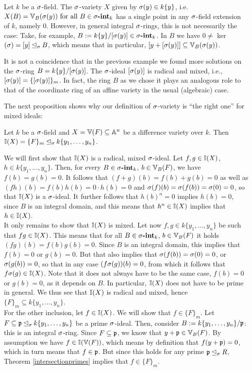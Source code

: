 \begin{ex}
Let $k$ be a $\sigma$-field. The $\sigma$-variety $X$ given by $\sigma(y) \in k\{y\}$, i.e. $X(B) = \mathbb{V}_B(\sigma(y)) \text{ for all } B \in \sigma\text{{\normalfont\textbf{-int}}}_k$ has a single point in any $\sigma$-field extension of $k$, namely $0$. However, in general integral $\sigma$-rings,
this is not necessarily the case: Take, for example, $B:= k\{y\}/[\sigma(y)] \in \sigma\text{{\normalfont\textbf{-int}}}_k$. In $B$ we have $0 \neq $ ker$(\sigma) = [y] \unlhd_{\sigma} B$, which means that in particular, $[y + [\sigma(y)]] \subseteq \mathbb{V}_B(\sigma(y))$.
\end{ex}

It is not a coincidence that in the previous example we found more solutions on the $\sigma$-ring $B = k\{y\}/[\sigma(y)]$. The $\sigma$-ideal $[\sigma(y)]$ is radical and mixed, i.e., $[\sigma(y)] = \{ [\sigma(y)] \}_m$.
In fact, the ring $B$ as we chose it plays an analogous role to that of the coordinate ring of an affine variety in the usual (algebraic) case.

The next proposition shows why our definition of $\sigma$-variety is ``the right one'' for mixed ideals:

\begin{prop}\label{I=F_m}
Let $k$ be a $\sigma$-field and $X = \mathbb{V}(F) \subseteq \mathbb{A}^n$ be a difference variety over $k$. Then $\mathbb{I}(X) = \{F\}_m \unlhd_{\sigma} k\{y_1,\ldots,y_n\}$. 
\begin{bew}
We will first show that $\mathbb{I}(X)$ is a radical, mixed $\sigma$-ideal.
Let $f, g \in \mathbb{I}(X)$, $h \in k\{y_1,\ldots,y_n\}$. Then, for every $B \in \sigma\text{{\normalfont\textbf{-int}}}_k$, $b \in \mathbb{V}_B(F)$, we have $f(b) = g(b) = 0$.
It follows that $(f + g)(b) = f(b) + g(b) = 0$ as well as $(fh)(b) = f(b)h(b) = 0 \cdot h(b) = 0$ and $\sigma(f)(b) = \sigma(f(b)) = \sigma(0) = 0$, so that $\mathbb{I}(X)$ is a $\sigma$-ideal.
It further follows that $h(b)^n = 0$ implies $h(b) = 0$, since $B$ is an integral domain, and this means that $h^n \in \mathbb{I}(X)$ implies that $ h \in \mathbb{I}(X)$. \\
\indent It only remains to show that $\mathbb{I}(X)$ is mixed. Let now $f,g \in k\{y_1,\ldots,y_n\}$ be such that $fg \in \mathbb{I}(X)$. This means that for all  $B \in \sigma\text{{\normalfont\textbf{-int}}}_k$, $b \in \mathbb{V}_B(F)$ it holds
 $(fg)(b) = f(b) g(b) = 0$. Since $B$ is an integral domain,
this implies that $f(b) = 0$ or $g(b) = 0$. But that also implies that $\sigma(f(b)) = \sigma(0) = 0$, or $\sigma(g(b)) = 0$, so that in any case $(f\sigma(g))(b) = 0$, from which it follows that $f\sigma(g) \in \mathbb{I}(X)$.
Note that it does not always have to be the same case, $f(b) = 0$ or $g(b) = 0$, as it depends on $B$. In particular, $\mathbb{I}(X)$ does not have to be prime in general. We thus see that $\mathbb{I}(X)$ is radical and mixed, hence $\{F\}_m \subseteq k\{y_1,\ldots,y_n\}$. \\
\indent For the other inclusion, let $f \in \mathbb{I}(X)$. We will show that $f \in \{F\}_m$. Let $F \subseteq \mathfrak{p} \unlhd_{\sigma} k\{y_1,\ldots,y_n\}$ be a prime $\sigma$-ideal.
Then, consider $B:= k\{y_1,\ldots,y_n\}/\mathfrak{p}$: this is an integral $\sigma$-ring. Since $F \subseteq \mathfrak{p}$, we know that $y + \mathfrak{p} \in \mathbb{V}_B(F)$. By assumption we have $f \in \mathbb{I}(\mathbb{V}(F))$, which means by definition that $f(y + \mathfrak{p}) = 0$, which
in turn means that $f \in \mathfrak{p}$. But since this holds for any prime $\mathfrak{p} \unlhd_{\sigma} R$, Theorem \ref{intersectionprimes} implies that $f \in \{F\}_m$.
\end{bew}
\end{prop}

